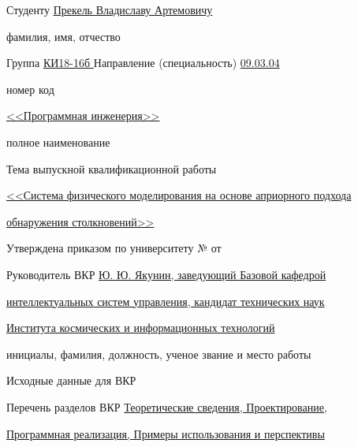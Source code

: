 \begin{spacing}{1}{
        \setlength{\parindent}{0cm}

        Студенту \uline{\hfill Прекель Владиславу Артемовичу \hfill}

        \vspace{-4pt}
        {\footnotesize\hfill фамилия, имя, отчество \hfill}

        Группа \uline{\hfill КИ18-16б \hfill} Направление (специальность) \uline{\hfill\hfill 09.03.04 \hfill\hfill}

        \vspace{-4pt}
        {\footnotesize {\normalsize\hspace{8ex}} \hfill номер \hfill {\normalsize\hspace{32ex}} \hfill\hfill код \hfill\hfill}

        \uline{\hfill <<Программная инженерия>> \hfill}

        \vspace{-4pt}
        {\footnotesize  \hfill полное наименование \hfill}

        Тема выпускной квалификационной работы \uline{\hfill}

        \uline{\hfill<<Система физического моделирования на основе априорного подхода\hfill}

        \uline{\hfill обнаружения столкновений>>\hfill}

        Утверждена приказом по университету № \uline{\hfill} от \uline{\hfill\hfill\hfill}

        Руководитель ВКР \uline{\hfill Ю. Ю. Якунин, заведующий Базовой кафедрой \hfill}

        \uline{\hfill интеллектуальных систем управления, кандидат технических наук \hfill}

        \uline{\hfill Института космических и информационных технологий \hfill}

        \vspace{-4pt}
        {\footnotesize \hfill инициалы, фамилия, должность, ученое звание и место работы \hfill}

        Исходные данные для ВКР \uline{\hfill}

        \uline{\hfill}

        \uline{\hfill}

        Перечень разделов ВКР \uline{Теоретические сведения, Проектирование, \hfill}

        \uline{Программная реализация, Примеры использования и перспективы \hfill}

}
\end{spacing}

